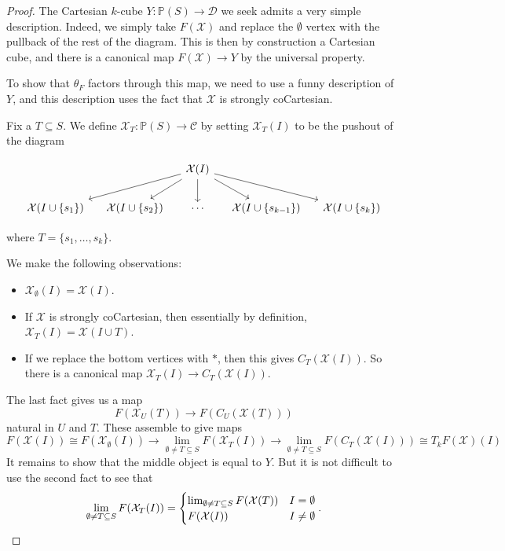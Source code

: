 \documentclass{shortart}
\theoremstyle{definition}
\newcommand\lims{\lim_{\emptyset \neq T \subseteq S}}
\renewcommand\P{\mathbb{P}}
\begin{document}
\begin{proof}
  The Cartesian $k$-cube $Y: \P(S) \to \mathcal{D}$ we seek admits a very simple description. Indeed, we simply take $F(\mathcal{X})$ and replace the $\emptyset$ vertex with the pullback of the rest of the diagram. This is then by construction a Cartesian cube, and there is a canonical map $F(\mathcal{X}) \to Y$ by the universal property.

  To show that $\theta_F$ factors through this map, we need to use a funny description of $Y$, and this description uses the fact that $\mathcal{X}$ is strongly coCartesian.

  Fix a $T \subseteq S$. We define $\mathcal{X}_T: \P(S) \to \mathcal{C}$ by setting $\mathcal{X}_T(I)$ to be the pushout of the diagram
  \begin{useimager}
    \[
      \begin{tikzcd}[column sep=small]
        & & \mathcal{X}(I) \ar[dll] \ar[dl] \ar[d] \ar[dr] \ar[drr]\\
        \mathcal{X}(I \cup \{s_1\}) & \mathcal{X}(I \cup \{s_2\}) & \cdots & \mathcal{X}(I \cup \{s_{k - 1}\}) & \mathcal{X}(I \cup \{s_k\})
      \end{tikzcd}
    \]
  \end{useimager}
  where $T = \{s_1, \ldots, s_k\}$.

  We make the following observations:
  \begin{itemize}
    \item $\mathcal{X}_{\emptyset}(I) = \mathcal{X}(I)$.
    \item If $\mathcal{X}$ is strongly coCartesian, then essentially by definition, $\mathcal{X}_T(I) = \mathcal{X}(I \cup T)$.
    \item If we replace the bottom vertices with $*$, then this gives $C_T(\mathcal{X}(I))$. So there is a canonical map $\mathcal{X}_T(I) \to C_T(\mathcal{X}(I))$.
  \end{itemize}
  The last fact gives us a map
  \[
    F(\mathcal{X}_U(T)) \to F(C_U(\mathcal{X}(T)))
  \]
  natural in $U$ and $T$. These assemble to give maps
  \[
    F(\mathcal{X}(I)) \cong F(\mathcal{X}_{\emptyset}(I)) \to \lim_{\emptyset \not= T \subseteq S} F(\mathcal{X}_T(I)) \to \lim_{\emptyset \not= T \subseteq S} F(C_T(\mathcal{X}(I))) \cong T_kF(\mathcal{X})(I)
  \]
  It remains to show that the middle object is equal to $Y$. But it is not difficult to use the second fact to see that
  \[
    \lims F(\mathcal{X}_T(I)) =
    \begin{cases}
      \lims F(\mathcal{X}(T)) & I = \emptyset\\
      F(\mathcal{X}(I)) & I \neq \emptyset
    \end{cases}.\qedhere
  \]
\end{proof}
\end{document}
